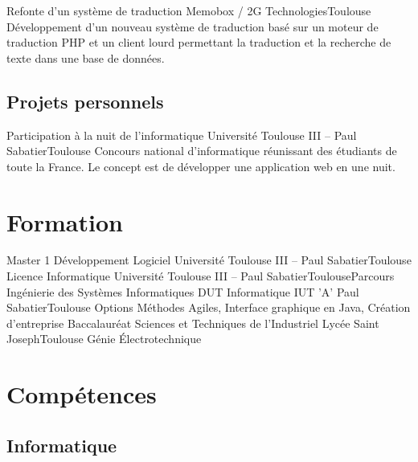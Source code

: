 \documentclass{my_cv_bis}
\begin{document}
	{ Refonte d’un système de traduction }
	{Memobox / 2G Technologies}{Toulouse}
	{Développement d'un nouveau système de traduction basé sur un moteur de traduction PHP et un client lourd
	permettant la traduction et la recherche de texte dans une base de données.  } {}
	\subsection{Projets personnels}
	{Participation à la nuit de l'informatique}
	{Université Toulouse III -- Paul Sabatier}{Toulouse}
	{ Concours national d’informatique réunissant des étudiants de toute la France. Le concept est de développer une application web en une nuit.} 
	{}
	\vspace{-20px}
\section{Formation}
	{Master 1 Développement Logiciel}
	{Université Toulouse III -- Paul Sabatier}{Toulouse}{}{}
	{Licence Informatique}
	{Université Toulouse III -- Paul Sabatier}{Toulouse}{Parcours Ingénierie des Systèmes Informatiques}{}
	{DUT Informatique}
	{IUT 'A' Paul Sabatier}{Toulouse}
	{Options Méthodes Agiles, Interface graphique en Java, Création d'entreprise}
	{}
	{Baccalauréat Sciences et Techniques de l'Industriel}
	{Lycée Saint Joseph}{Toulouse}
	{Génie Électrotechnique}{}
	\vspace{-20px}
\section{Compétences}
		\subsection{Informatique}
		\\
		\\
		\\
		\\
		\\
\end{document}

